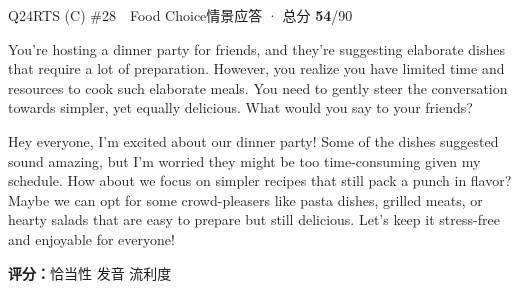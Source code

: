 \begin{qblock}{Q24\quad RTS (C) \#28\ \ Food Choice}{情景应答 · 总分 \textcolor{cAccent}{\bfseries 54}/90}
\begin{promptbox}
You're hosting a dinner party for friends, and they're suggesting elaborate dishes that require a lot of preparation. However, you realize you have limited time and resources to cook such elaborate meals. You need to gently steer the conversation towards simpler, yet equally delicious. What would you say to your friends?
\end{promptbox}
\begin{modelbox}
Hey everyone, I'm excited about our dinner party! Some of the dishes suggested sound amazing, but I'm worried they might be too time-consuming given my schedule. How about we focus on simpler recipes that still pack a punch in flavor? Maybe we can opt for some crowd-pleasers like pasta dishes, grilled meats, or hearty salads that are easy to prepare but still delicious. Let's keep it stress-free and enjoyable for everyone!
\end{modelbox}
\asrlegend
\begin{asrbox}
                                                  
\end{asrbox}
\smallskip
{\small\textbf{评分：}恰当性  \quad\textperiodcentered\quad 发音  \quad\textperiodcentered\quad 流利度 }
\end{qblock}


